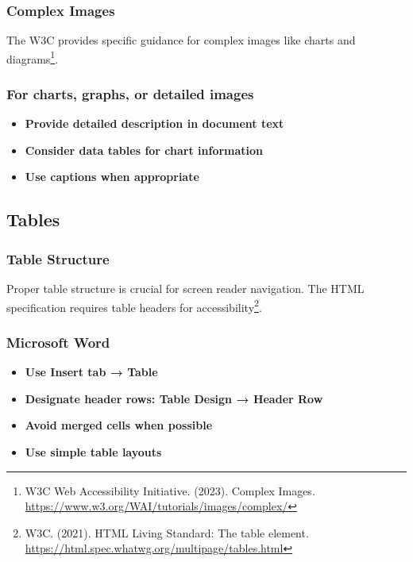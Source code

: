 \subsubsection{Complex Images}
The W3C provides specific guidance for complex images like charts and diagrams\footnote{W3C Web Accessibility Initiative. (2023). Complex Images. \url{https://www.w3.org/WAI/tutorials/images/complex/}}.

\subsubsection{For charts, graphs, or detailed images}
\vspace{1em}
\begin{itemize}
\item \textbf{Provide detailed description in document text}
\item \textbf{Consider data tables for chart information}
\item \textbf{Use captions when appropriate}
\end{itemize}
\vspace{1em}

\subsection{Tables}

\subsubsection{Table Structure}
Proper table structure is crucial for screen reader navigation. The HTML specification requires table headers for accessibility\footnote{W3C. (2021). HTML Living Standard: The table element. \url{https://html.spec.whatwg.org/multipage/tables.html}}.

\subsubsection{Microsoft Word}
\vspace{1em}
\begin{itemize}
\item \textbf{Use Insert tab → Table}
\item \textbf{Designate header rows: Table Design → Header Row}
\item \textbf{Avoid merged cells when possible}
\item \textbf{Use simple table layouts}
\end{itemize}
\vspace{1em}

